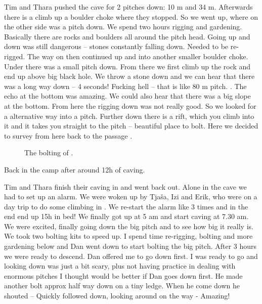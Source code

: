Tim and Thara pushed the cave for 2 pitches down: 10 m and 34 m.
Afterwards there is a climb up a boulder choke where they stopped. So we
went up, where on the other side was a pitch down. We spend two hours
rigging and gardening. Basically there are rocks and boulders all around
the pitch head. Going up and down was still dangerous -- stones
constantly falling down. Needed to be re-rigged. The way on then
continued up and into another smaller boulder choke. Under there was a
small pitch down. From there we first climb up the rock and end up above
big black hole. We throw a stone down and we can hear that there was a
long way down -- 4 seconds! Fucking hell -- that is like 80 m pitch.
. The echo at the bottom was
amazing. We could also hear that there was a big slope at the bottom.
From here the rigging down was not really good. So we looked for a
alternative way into a pitch. Further down there is a rift, which you
climb into it and it takes you straight to the pitch -- beautiful place
to bolt. Here we decided to survey from here back to the passage .


\begin{figure}
\checkoddpage \ifoddpage \forcerectofloat \else \forceversofloat \fi
{}
\caption{The bolting of . }
\label{walk the line cartoon}
\end{figure}


Back in the camp after around 12h of caving.

Tim and Thara finish their caving in  and went
back out. Alone in the cave we had to set up an alarm. We were woken up
by Tjaša, Izi and Erik, who were on a day trip to do some climbing in
. We re-start the alarm like 3 times and in the end end up
15h in bed! We finally got up at 5 am and start caving at 7.30 am. We
were excited, finally going down the big pitch and to see how big it
really is. We took two bolting kits to speed up. I spend time re-rigging,
bolting and more gardening below  and Dan went down to
start bolting the big pitch. After 3 hours we were ready to descend. Dan
offered me to go down first. I was ready to go and looking down was just
a bit scary, plus not having practice in dealing with enormous pitches I
thought would be better if Dan goes down first. He made another bolt
approx half way down on a tiny ledge. When he come down he shouted --  Quickly followed down, looking around on the
way - Amazing!

